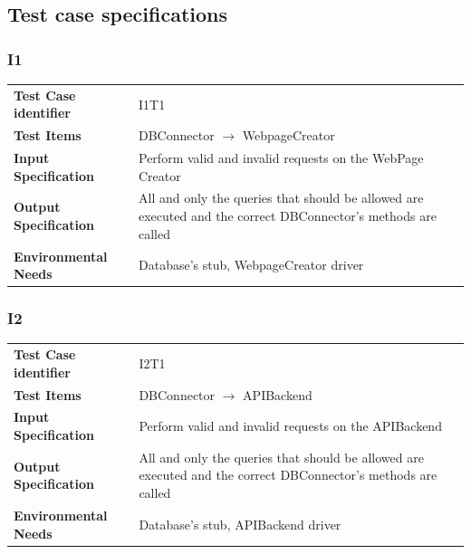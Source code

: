 \documentclass{article}
\begin{document}
\subsection{Test case specifications}
\subsubsection{I1}
\begin{adjustbox}{width=1.2\textwidth}	
	\begin{tabular}{*{2}{p{}}}
		\toprule
		\textbf{Test Case identifier} & I1T1\\
		\textbf{Test Items} & DBConnector $\rightarrow$ WebpageCreator\\
		\textbf{Input Specification} & Perform valid and invalid requests on the WebPage Creator\\
		\textbf{Output Specification} & All and only the queries that should be allowed are executed and the correct DBConnector's methods are called\\
		\textbf{Environmental Needs} & Database's stub, WebpageCreator driver\\
		\bottomrule
	\end{tabular}
\end{adjustbox}
\subsubsection{I2}
\begin{adjustbox}{width=1.2\textwidth}	
	\begin{tabular}{*{2}{p{}}}
		\toprule
		\textbf{Test Case identifier} & I2T1\\
		\textbf{Test Items} & DBConnector $\rightarrow$ APIBackend\\
		\textbf{Input Specification} & Perform valid and invalid requests on the APIBackend\\
		\textbf{Output Specification} & All and only the queries that should be allowed are executed and the correct DBConnector's methods are called\\
		\textbf{Environmental Needs} & Database's stub, APIBackend driver\\
		\bottomrule
	\end{tabular}
\end{adjustbox}
\end{document}
